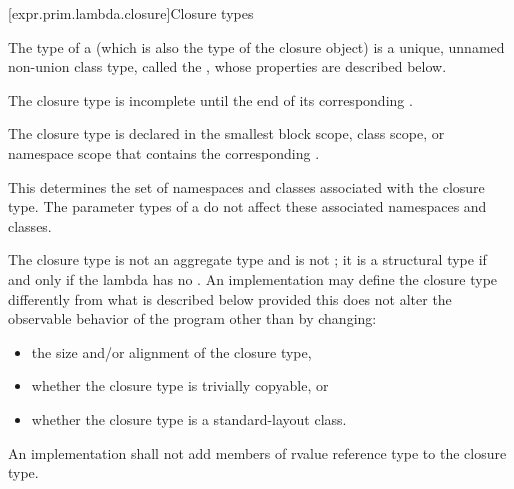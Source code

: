 [expr.prim.lambda.closure]{Closure types}%

\pnum
The type of a  (which is also the type of the
closure object) is a unique, unnamed non-union class type,
called the ,
whose properties are described below.

\pnum
The closure type is incomplete
until the end of its corresponding .

\pnum
The closure type is declared in the smallest block
scope, class scope, or namespace scope that contains the corresponding
.
\begin{note}
This determines the set of namespaces and
classes associated with the closure type. The parameter
types of a  do not affect these associated namespaces and
classes.
\end{note}

\pnum
The closure type is not an aggregate type
and is not ;
it is a structural type if and only if
the lambda has no .
An implementation may define the closure type differently from what
is described below provided this does not alter the observable behavior of the program
other than by changing:
\begin{itemize}
\item the size and/or alignment of the closure type,
\item whether the closure type is trivially copyable, or
\item whether the closure type is a standard-layout class.
\end{itemize}

An implementation shall not add members of rvalue reference type to the closure
type.

